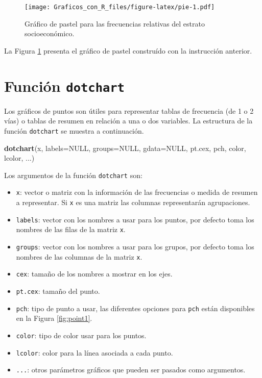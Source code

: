 \documentclass[10pt,]{krantz}
\makeatletter
\newenvironment{Shaded}{\begin{snugshade}}{\end{snugshade}}
\newcommand{\KeywordTok}[1]{\textcolor[rgb]{0.13,0.29,0.53}{\textbf{#1}}}
\newcommand{\DataTypeTok}[1]{\textcolor[rgb]{0.13,0.29,0.53}{#1}}
\newcommand{\OtherTok}[1]{\textcolor[rgb]{0.56,0.35,0.01}{#1}}
\newcommand{\NormalTok}[1]{#1}
\providecommand{\tightlist}{%
  \setlength{\itemsep}{0pt}\setlength{\parskip}{0pt}}
\newenvironment{kframe}{%
\medskip{}
\setlength{\fboxsep}{.8em}
 \def\at@end@of@kframe{}%
 \ifinner\ifhmode%
  \def\at@end@of@kframe{\end{minipage}}%
  \begin{minipage}{\columnwidth}%
 \fi\fi%
 \def\FrameCommand##1{\hskip\@totalleftmargin \hskip-\fboxsep
 \colorbox{shadecolor}{##1}\hskip-\fboxsep
     \hskip-\linewidth \hskip-\@totalleftmargin \hskip\columnwidth}%
 \MakeFramed {\advance\hsize-\width
   \@totalleftmargin\z@ \linewidth\hsize
   \@setminipage}}%
 {\par\unskip\endMakeFramed%
 \at@end@of@kframe}
\renewenvironment{Shaded}{\begin{kframe}}{\end{kframe}}
\makeatother
\begin{document}
\begin{figure}
\centering
\texttt{[image: Graficos\_con\_R\_files/figure-latex/pie-1.pdf]}
\caption{\label{fig:pie}Gráfico de pastel para las frecuencias relativas del
estrato socioeconómico.}
\end{figure}

La Figura \ref{fig:pie} presenta el gráfico de pastel construído con la
instrucción anterior.

\section{\texorpdfstring{Función \texttt{dotchart}
}{Función dotchart  }}\label{funcion-dotchart}

Los gráficos de puntos son útiles para representar tablas de frecuencia
(de 1 o 2 vías) o tablas de resumen en relación a una o dos variables.
La estructura de la función \texttt{dotchart} se muestra a continuación.

\begin{Shaded}
\begin{Highlighting}[]
\KeywordTok{dotchart}\NormalTok{(x, }\DataTypeTok{labels=}\OtherTok{NULL}\NormalTok{, }\DataTypeTok{groups=}\OtherTok{NULL}\NormalTok{, }\DataTypeTok{gdata=}\OtherTok{NULL}\NormalTok{,}
\NormalTok{         pt.cex, pch, color, lcolor, ...)}
\end{Highlighting}
\end{Shaded}

Los argumentos de la función \texttt{dotchart} son:

\begin{itemize}
\tightlist
\item
  \texttt{x}: vector o matriz con la información de las frecuencias o
  medida de resumen a representar. Si \texttt{x} es una matriz las
  columnas representarán agrupaciones.
\item
  \texttt{labels}: vector con los nombres a usar para los puntos, por
  defecto toma los nombres de las filas de la matriz \texttt{x}.
\item
  \texttt{groups}: vector con los nombres a usar para los grupos, por
  defecto toma los nombres de las columnas de la matriz \texttt{x}.
\item
  \texttt{cex}: tamaño de los nombres a mostrar en los ejes.
\item
  \texttt{pt.cex}: tamaño del punto.
\item
  \texttt{pch}: tipo de punto a usar, las diferentes opciones para
  \texttt{pch} están disponibles en la Figura \ref{fig:point1}.
\item
  \texttt{color}: tipo de color usar para los puntos.
\item
  \texttt{lcolor}: color para la línea asociada a cada punto.
\item
  \texttt{...}: otros parámetros gráficos que pueden ser pasados como
  argumentos.
\end{itemize}
\end{document}
